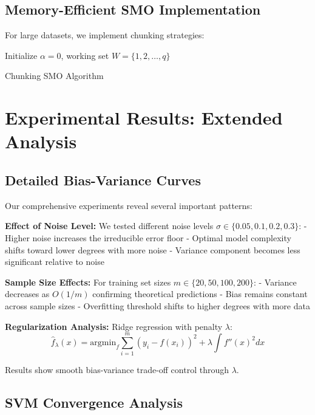 \documentclass[12pt, a4paper]{article}
\begin{document}
\subsection{Memory-Efficient SMO Implementation}

For large datasets, we implement chunking strategies:

\begin{algorithm}[H]
\SetAlgoLined
{}
Initialize $\alpha = 0$, working set $W = \{1, 2, \ldots, q\}$\;
\caption{Chunking SMO Algorithm}
\end{algorithm}

\section{Experimental Results: Extended Analysis}

\subsection{Detailed Bias-Variance Curves}

Our comprehensive experiments reveal several important patterns:

\textbf{Effect of Noise Level:}
We tested different noise levels $\sigma \in \{0.05, 0.1, 0.2, 0.3\}$:
- Higher noise increases the irreducible error floor
- Optimal model complexity shifts toward lower degrees with more noise
- Variance component becomes less significant relative to noise

\textbf{Sample Size Effects:}
For training set sizes $m \in \{20, 50, 100, 200\}$:
- Variance decreases as $O(1/m)$ confirming theoretical predictions
- Bias remains constant across sample sizes
- Overfitting threshold shifts to higher degrees with more data

\textbf{Regularization Analysis:}
Ridge regression with penalty $\lambda$:
\begin{equation}
\hat{f}_\lambda(x) = \text{argmin}_f \sum_{i=1}^m (y_i - f(x_i))^2 + \lambda \int f''(x)^2 dx
\end{equation}

Results show smooth bias-variance trade-off control through $\lambda$.

\subsection{SVM Convergence Analysis}
\end{document}
